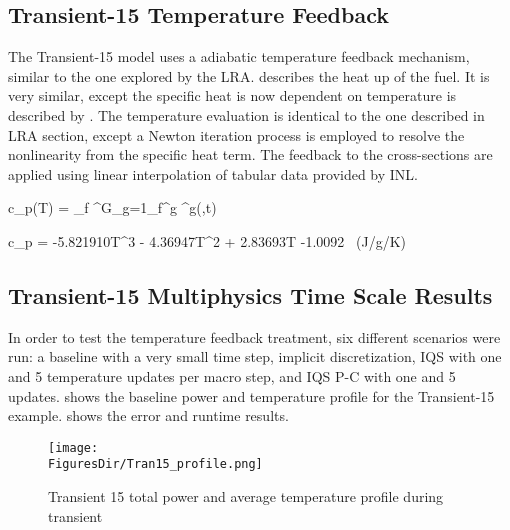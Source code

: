 \subsection{Transient-15 Temperature Feedback}

The Transient-15 model uses a adiabatic temperature feedback mechanism, similar to the one explored by the LRA.  describes the heat up of the fuel.  It is very similar, except the specific heat is now dependent on temperature is described by .  The temperature evaluation is identical to the one described in LRA section, except a Newton iteration process is employed to resolve the nonlinearity from the specific heat term.  The feedback to the cross-sections are applied using linear interpolation of tabular data provided by INL.

\be
\rho c_p(T)  = \kappa_f \sum^G_{g=1}\Sigma_f^g \phi^g(,t)
\label{eq:temp2}
\ee

\be
c_p = -5.821910T^3 - 4.36947T^2 + 2.83693T -1.0092 \ (J/g/K)
\label{eq:cp}
\ee

\subsection{Transient-15 Multiphysics Time Scale Results}

In order to test the temperature feedback treatment, six different scenarios were run: a baseline with a very small time step, implicit discretization, IQS with one and 5 temperature updates per macro step, and IQS P-C with one and 5 updates.   shows the baseline power and temperature profile for the Transient-15 example.   shows the error and runtime results.

\begin{figure}[htbp!]
\centering
\texttt{[image: \\FiguresDir/Tran15\_profile.png]}
\caption{Transient 15 total power and average temperature profile during transient}
\label{fig:Tran15_profile}
\end{figure}

